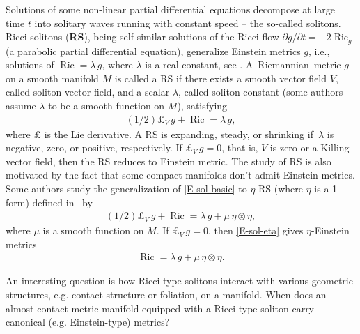 \documentclass[11pt,a4paper,twoside]{article}
\def\Ric{\operatorname{Ric}}
\begin{document}
Solutions of some non-linear  partial differential equations decompose at large time $t$ into solitary waves running with constant speed -- the so-called solitons.
Ricci solitons (\textbf{RS}), being self-similar solutions of the Ricci flow $\partial g/\partial t = -2\Ric_g$ (a parabolic partial differential equation),
generalize Einstein metrics $g$, i.e., solutions of $\Ric = \lambda\,g$, where $\lambda$ is a real constant, see \cite{CLN-2006}.
A~Riemannian~metric $g$ on a smooth manifold $M$ is called a RS if there exists a smooth vector field $V$, called soliton vector field, and a scalar $\lambda$, called soliton constant (some authors assume $\lambda$ to be a smooth function on $M$), satisfying
\begin{align}\label{E-sol-basic}
 (1/2)\pounds_V\,g + \Ric = \lambda\,g,
\end{align}
where $\pounds$ is the Lie derivative. A RS is {expanding}, {steady}, or {shrinking} if $\,\lambda$ is negative, zero, or positive, respectively.
If $\pounds_V\,g=0$, that is, $V$ is zero or a Killing vector field, then the RS reduces to Einstein metric.
The study of RS is also motivated by the fact that some compact manifolds don't admit Einstein metrics.
Some authors study the generalization of \eqref{E-sol-basic} to $\eta$-RS (where $\eta$ is a 1-form) defined in \cite{cho2009ricci}~by
\begin{align}\label{E-sol-eta}
 (1/2)\pounds_V\,g+\Ric=\lambda\,g +\mu\,\eta\otimes\eta,
\end{align}
where $\mu$ is a smooth function on $M$. If $\pounds_V\,g=0$, then \eqref{E-sol-eta} gives $\eta$-Einstein metrics
\begin{align}\label{E-eta-Einstein}
 \Ric=\lambda\,g +\mu\,\eta\otimes\eta.
\end{align}

An interesting question is how Ricci-type solitons interact with various geometric structures, e.g. contact structure or foliation, on a manifold.
When does an almost contact metric manifold equipped with a Ricci-type soliton carry canonical (e.g. Einstein-type) metrics?
\end{document}
